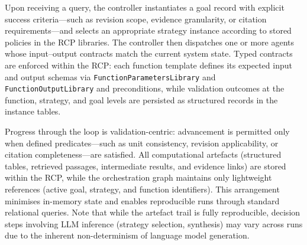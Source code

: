 \documentclass[largeformat]{interact}
\begin{document}

Upon receiving a query, the controller instantiates a goal record with explicit success criteria---such as revision scope, evidence granularity, or citation requirements---and selects an appropriate strategy instance according to stored policies in the RCP libraries. The controller then dispatches one or more agents whose input--output contracts match the current system state. Typed contracts are enforced within the RCP: each function template defines its expected input and output schemas via \texttt{FunctionParametersLibrary} and \texttt{FunctionOutputLibrary} and preconditions, while validation outcomes at the function, strategy, and goal levels are persisted as structured records in the instance tables.

Progress through the loop is validation-centric: advancement is permitted only when defined predicates---such as unit consistency, revision applicability, or citation completeness---are satisfied. All computational artefacts (structured tables, retrieved passages, intermediate results, and evidence links) are stored within the RCP, while the orchestration graph maintains only lightweight references (active goal, strategy, and function identifiers). This arrangement minimises in-memory state and enables reproducible runs through standard relational queries. Note that while the artefact trail is fully reproducible, decision steps involving LLM inference (strategy selection, synthesis) may vary across runs due to the inherent non-determinism of language model generation.
\end{document}
